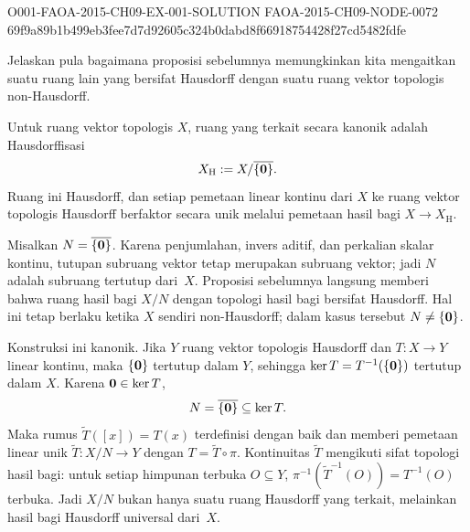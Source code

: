 \begin{o001solution}
  {O001-FAOA-2015-CH09-EX-001-SOLUTION}
  {FAOA-2015-CH09-NODE-0072}
  {69f9a89b1b499eb3fee7d7d92605c324b0dabd8f66918754428f27cd5482fdfe}
\begin{o001statement}
Jelaskan pula bagaimana proposisi sebelumnya memungkinkan kita mengaitkan suatu ruang lain yang bersifat Hausdorff dengan
suatu ruang vektor topologis non-Hausdorff.
\end{o001statement}
\begin{o001answer}
Untuk ruang vektor topologis $X$, ruang yang terkait secara kanonik adalah
Hausdorffisasi
\[
  X_{\mathrm H}:=X/\overline{\{\mathbf{0}\}}.
\]
Ruang ini Hausdorff, dan setiap pemetaan linear kontinu dari $X$ ke ruang
vektor topologis Hausdorff berfaktor secara unik melalui pemetaan hasil bagi
$X\to X_{\mathrm H}$.
\end{o001answer}
\begin{o001proof}
Misalkan $N=\overline{\{\mathbf{0}\}}$. Karena penjumlahan, invers aditif, dan
perkalian skalar kontinu, tutupan subruang vektor tetap merupakan subruang
vektor; jadi $N$ adalah subruang tertutup dari~$X$. Proposisi sebelumnya
langsung memberi bahwa ruang hasil bagi $X/N$ dengan topologi hasil bagi
bersifat Hausdorff. Hal ini tetap berlaku ketika $X$ sendiri non-Hausdorff;
dalam kasus tersebut $N\ne\{\mathbf{0}\}$.

Konstruksi ini kanonik. Jika $Y$ ruang vektor topologis Hausdorff dan
$T:X\to Y$ linear kontinu, maka $\{\mathbf{0}\}$ tertutup dalam $Y$, sehingga
$\ker T=T^{-1}(\{\mathbf{0}\})$ tertutup dalam $X$. Karena $\mathbf{0}\in\ker T$,
\[
  N=\overline{\{\mathbf{0}\}}\subseteq\ker T.
\]
Maka rumus $\widetilde T([x])=T(x)$ terdefinisi dengan baik dan memberi
pemetaan linear unik $\widetilde T:X/N\to Y$ dengan
$T=\widetilde T\circ\pi$. Kontinuitas $\widetilde T$ mengikuti sifat
topologi hasil bagi: untuk setiap himpunan terbuka $O\subseteq Y$,
$\pi^{-1}(\widetilde T^{-1}(O))=T^{-1}(O)$ terbuka. Jadi $X/N$ bukan hanya
suatu ruang Hausdorff yang terkait, melainkan hasil bagi Hausdorff universal
dari~$X$.
\end{o001proof}
\end{o001solution}
